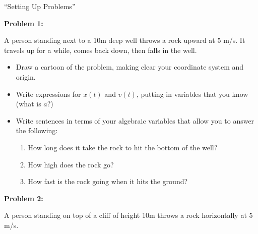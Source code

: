 \documentclass[12pt]{article}
\newcommand{\BC}{\begin{center}}
\newcommand{\EC}{\end{center}}
\begin{document}
\Large
\centerline{}
\large
\BC
\sc
``Setting Up Problems''
\EC
\normalsize

{\large \bf Problem 1:}

A person standing next to a 10m deep well throws a rock upward at 5 m/s. It travels up for a while, comes
back down, then falls in the well. 



\begin{itemize}

\item Draw a cartoon of the problem, making clear your coordinate system and origin.

\vspace{1.2in}

\item Write expressions for $x(t)$ and $v(t)$, putting in variables that you know (what is $a$?)

\vspace{1.2in}

\item Write sentences in terms of your algebraic variables that allow you to answer the following:


\begin{enumerate}
\item How long does it take the rock to hit the bottom of the well?
\vspace{0.7in}
\item How high does the rock go?
\vspace{0.7in}
\item How fast is the rock going when it hits the ground?
\end{enumerate}
\end{itemize}
\newpage

{\large \bf Problem 2:}

A person standing on top of a cliff of height 10m throws a rock horizontally at 5 m/s. 
\end{document}
